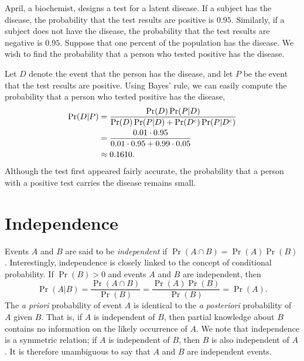 \begin{example}
April, a biochemist, designs a test for a latent disease.
If a subject has the disease, the probability that the test results are positive is $0.95$.
Similarly, if a subject does not have the disease, the probability that the test results are negative is $0.95$.
Suppose that one percent of the population has the disease.
We wish to find the probability that a person who tested positive has the disease.

Let $D$ denote the event that the person has the disease, and let $P$ be the event that the test results are positive.
Using Bayes' rule, we can easily compute the probability that a person who tested positive has the disease,
\begin{equation*}
\begin{split}
\Pr (D|P)
&= \frac{ \Pr(D) \Pr(P|D) }{ \Pr(D) \Pr(P|D) + \Pr(D^{\mathrm{c}}) \Pr(P|D^{\mathrm{c}}) } \\
&= \frac{ 0.01 \cdot 0.95 }{ 0.01 \cdot 0.95 + 0.99 \cdot 0.05 } \\
&\approx 0.1610 .
\end{split}
\end{equation*}
Although the test first appeared fairly accurate, the probability that a person with a positive test carries the disease remains small.
\end{example}


\section{Independence}
\label{section:Independence}

Events $A$ and $B$ are said to be \emph{independent} if $\Pr (A \cap B) = \Pr(A) \Pr(B)$. 
Interestingly, independence is closely linked to the concept of conditional probability.
If $\Pr(B) > 0$ and events $A$ and $B$ are independent, then
\begin{equation*}
\Pr (A | B) = \frac{ \Pr (A \cap B) }{\Pr (B)}
= \frac{ \Pr (A) \Pr(B) }{\Pr (B)}
= \Pr (A).
\end{equation*}
The \emph{a priori} probability of event $A$ is identical to the \emph{a posteriori} probability of $A$ given $B$.
That is, if $A$ is independent of $B$, then partial knowledge about $B$ contains no information on the likely occurrence of $A$.
We note that independence is a symmetric relation; if $A$ is independent of $B$, then $B$ is also independent of $A$.
It is therefore unambiguous to say that $A$ and $B$ are independent events.

